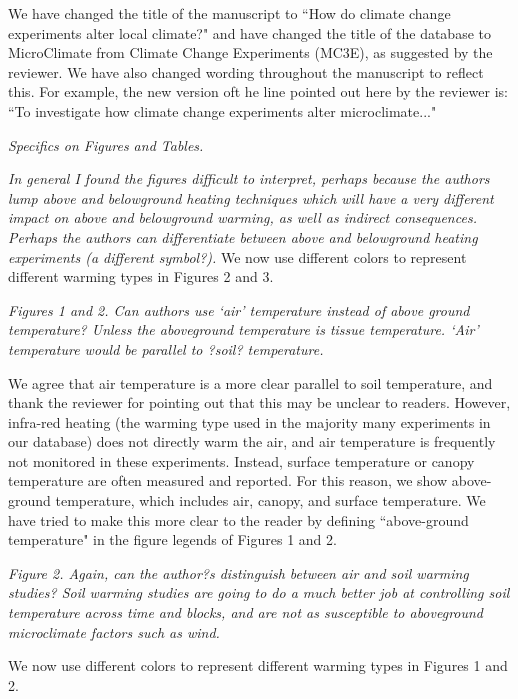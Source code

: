 \documentclass[11pt,a4paper]{letter}
\begin{document}
\par We have changed the title of the manuscript to ``How do climate change experiments alter local climate?" and have changed the title of the database to MicroClimate from Climate Change Experiments (MC3E), as suggested by the reviewer. We have also changed wording throughout the manuscript to reflect this. For example, the new version oft he line pointed out here by the reviewer is: ``To investigate how climate change experiments alter microclimate..."

\par \emph{Specifics on Figures and Tables.}
\par \emph{In general I found the figures difficult to interpret, perhaps because the authors lump above and belowground heating techniques which will have a very different impact on above and belowground warming, as well as indirect consequences.  Perhaps the authors can differentiate between above and belowground heating experiments (a different symbol?).}
We now use different colors  to represent different warming types in Figures 2 and 3.

\par \emph{Figures 1 and 2. Can authors use `air' temperature instead of above ground temperature? Unless the aboveground temperature is tissue temperature.  `Air' temperature would be parallel to ?soil? temperature. }
\par We agree that air temperature is a more clear parallel to soil temperature, and thank the reviewer for pointing out that this may be unclear to readers. However, infra-red heating (the warming type used in the majority many experiments in our database)  does not directly warm the air, and air temperature is frequently not monitored in these experiments. Instead, surface temperature or canopy temperature are often measured and reported. For this reason, we show above-ground temperature, which includes air, canopy, and surface temperature. We have tried to make this more clear to the reader by defining ``above-ground temperature" in the figure legends of Figures 1 and 2.

\par \emph{Figure 2.  Again, can the author?s distinguish between air and soil warming studies?  Soil warming studies are going to do a much better job at controlling soil temperature across time and blocks, and are not as susceptible to aboveground microclimate factors such as wind.}
\par We now use different colors to represent different warming types in Figures 1 and 2.
\end{document}
